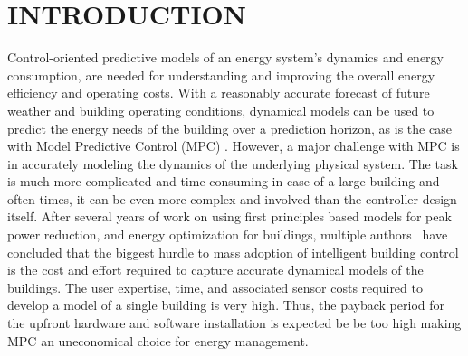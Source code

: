 \section{INTRODUCTION}
\label{S:intro}

Control-oriented predictive models of an energy system's dynamics and energy consumption, are needed for understanding and improving the overall energy efficiency and operating costs. With a reasonably accurate forecast of future weather and building operating conditions, dynamical models can be used to predict the energy needs of the building over a prediction horizon, as is the case with Model Predictive Control (MPC) \cite{Sturzenegger2016}. However, a major challenge with MPC is in accurately modeling the dynamics of the underlying physical system.
The task is much more complicated and time consuming in case of a large building and often times, it can be even more complex and involved than the controller design itself.
After several years of work on using first principles based models for peak power reduction, and energy optimization for buildings, multiple authors~\cite{Sturzenegger2016, vzavcekova2014} have concluded that the biggest hurdle to mass adoption of intelligent building control is the cost and effort required to capture accurate dynamical models of the buildings.
The user expertise, time, and associated sensor costs required to develop a model of a single building is very high. Thus, the payback period for the upfront hardware and software installation is expected be be too high making MPC an uneconomical choice for energy management.

